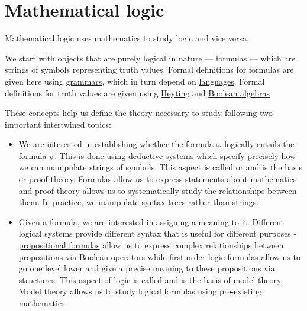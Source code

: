 \section{Mathematical logic}\label{sec:mathematical_logic}

Mathematical logic uses mathematics to study logic and vice versa.

We start with objects that are purely logical in nature --- formulas --- which are strings of symbols representing truth values. Formal definitions for formulas are given here using \hyperref[def:formal_grammar]{grammars}, which in turn depend on \hyperref[def:formal_language]{languages}. Formal definitions for truth values are given using \hyperref[def:heyting_algebra]{Heyting} and \hyperref[def:boolean_algebra]{Boolean algebras}

These concepts help us define the theory necessary to study following two important intertwined topics:
\begin{itemize}
  \item We are interested in establishing whether the formula \( \varphi \) logically entails the formula \( \psi \). This is done using \hyperref[def:deductive_system]{deductive systems} which specify precisely how we can manipulate strings of symbols. This aspect is called  or  and is the basis or \hyperref[def:proof_derivability]{proof theory}. Formulas allow us to express statements about mathematics and proof theory allows us to systematically study the relationships between them. In practice, we manipulate \hyperref[rem:abstract_syntax_tree]{syntax trees} rather than strings.

  \item Given a formula, we are interested in assigning a meaning to it. Different logical systems provide different syntax that is useful for different purposes - \hyperref[def:propositional_syntax/formula]{propositional formulas} allow us to express complex relationships between propositions via \hyperref[subsec:boolean_operators]{Boolean operators} while \hyperref[def:first_order_syntax/formula]{first-order logic formulas} allow us to go one level lower and give a precise meaning to these propositions via \hyperref[def:first_order_structure]{structures}. This aspect of logic is called  and is the basis of \hyperref[subsec:first_order_models]{model theory}. Model theory allows us to study logical formulas using pre-existing mathematics.
\end{itemize}

